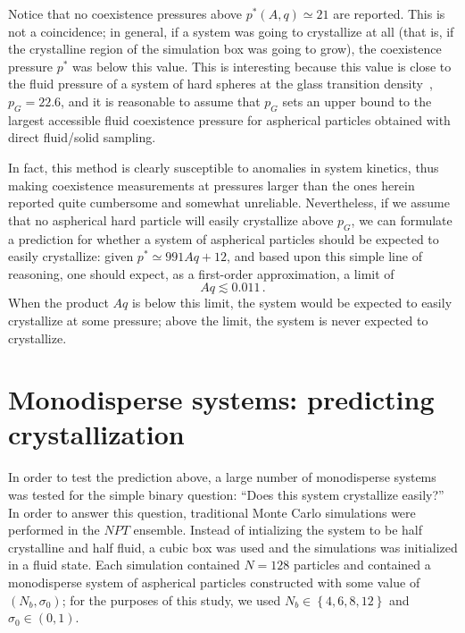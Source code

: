 Notice that no coexistence pressures above $p^*(A,q) \simeq 21$ are reported. 
This is not a coincidence; in general, if a system was going to crystallize at all (that is, if the crystalline region of the simulation box was going to grow), the coexistence pressure $p^*$ was below this value.
This is interesting because this value is close to the fluid pressure of a system of hard spheres
at the glass transition density~\cite{speedy}, $p_G = 22.6$, and  it is reasonable to assume that $p_G$ sets an upper bound to the 
largest accessible fluid coexistence pressure for aspherical particles obtained with direct fluid/solid sampling.

In fact, this method  
is clearly susceptible to anomalies in system kinetics, thus making coexistence measurements at pressures larger than the ones herein reported 
quite cumbersome and somewhat unreliable. Nevertheless, if we assume that no aspherical hard particle will easily crystallize above $p_G$, we can 
formulate a prediction for whether a system of aspherical particles should be expected to easily crystallize: given $p^* \simeq 991 Aq + 12$, and based upon this simple line of reasoning, one should expect, as a first-order approximation, a limit of
\begin{equation}Aq \lesssim 0.011 \,.\label{xtallimit}\end{equation}
When the product $Aq$ is below this limit, the system would be expected to easily crystallize at some pressure; above the limit, the system is never expected to crystallize.

\section{Monodisperse systems: predicting crystallization}\label{sec:disorderyesno}

In order to test the prediction above, a large number of monodisperse systems was tested for the simple binary question: ``Does this system crystallize easily?''
In order to answer this question, traditional Monte Carlo simulations were performed in the $NPT$ ensemble.
Instead of intializing the system to be half crystalline and half fluid, a cubic box was used and the simulations was initialized in a fluid state.
Each simulation contained $N = 128$ particles and contained a monodisperse system of aspherical particles constructed with some value of $(N_b, \sigma_0)$; for the purposes of this study, we used $N_b \in \left\{4,6,8,12\right\}$ and $\sigma_0 \in \left(0,1\right)$.

